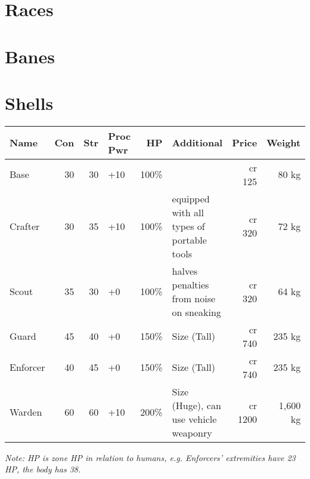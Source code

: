 \documentclass[12pt,a4paper,openany]{book}
\begin{document}
	\section{Races}
	
	\section{Banes}

	\section{Shells}
	\begin{tabularx}{\textwidth}{|l|r|r|l|r|X|r|r|}
		\hline
		Name & Con & Str & Proc Pwr & HP & Additional & Price & Weight \\ \hline
		Base & 30 & 30 & +10 & 100\% & & cr 125 & 80 kg \\ \hline
		Crafter & 30 & 35 & +10 & 100\% & equipped with all types of portable tools & cr 320 & 72 kg \\ \hline
		Scout & 35 & 30 & +0 & 100\% & halves penalties from noise on sneaking & cr 320 & 64 kg \\ \hline
		Guard & 45 & 40 & +0 & 150\% & Size (Tall) & cr 740 & 235 kg \\ \hline
		Enforcer & 40 & 45 & +0 & 150\% & Size (Tall) & cr 740 & 235 kg \\ \hline
		Warden & 60 & 60 & +10 & 200\% & Size (Huge), can use vehicle weaponry & cr 1200 & 1,600 kg \\ \hline
	\end{tabularx}
	\textit{Note: HP is zone HP in relation to humans, e.g. Enforcers' extremities have 23 HP, the body has 38.}
\end{document}

